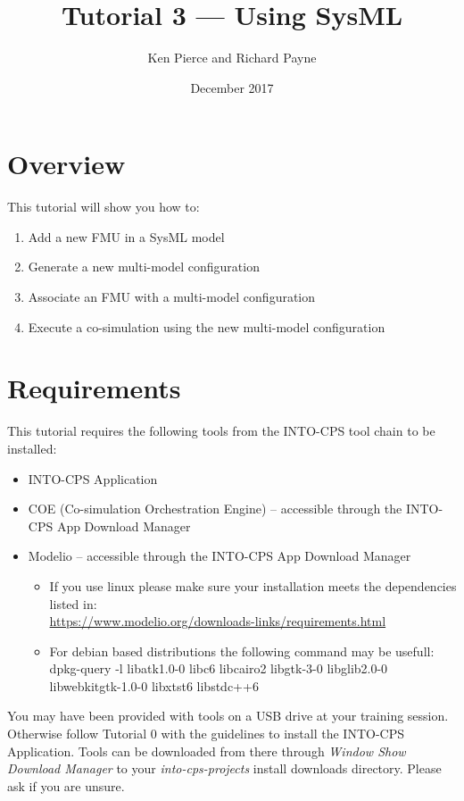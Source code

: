 \documentclass[11pt,a4paper]{../tutorial}
\title{Tutorial 3 --- Using SysML}
\date{December 2017}
\author{Ken Pierce and Richard Payne}
\begin{document}
\section*{Overview}

This tutorial will show you how to:

\begin{enumerate}[noitemsep]
\item Add a new FMU in a SysML model
\item Generate a new multi-model configuration
\item Associate an FMU with a multi-model configuration
\item Execute a co-simulation using the new multi-model configuration
\end{enumerate}

\section*{Requirements}

This tutorial requires the following tools from the INTO-CPS tool chain to be installed:

\begin{itemize}[noitemsep]
\item INTO-CPS Application
\item COE (Co-simulation Orchestration Engine) -- accessible through the INTO-CPS App Download Manager
\item Modelio -- accessible through the INTO-CPS App Download Manager
	\begin{small}
	\begin{itemize}
		\item If you use linux please make sure your installation meets the dependencies listed in:\\ \url{https://www.modelio.org/downloads-links/requirements.html}
		\item For debian based distributions the following command may be usefull:\\
		dpkg-query -l  libatk1.0-0 libc6 libcairo2 libgtk-3-0 libglib2.0-0 libwebkitgtk-1.0-0 libxtst6 libstdc++6
	\end{itemize}
	\end{small}
\end{itemize}

You may have been provided with tools on a USB drive at your training session. Otherwise follow Tutorial 0 with the guidelines to install the INTO-CPS Application. Tools can be downloaded from there through \emph{Window \menusep Show Download Manager} to your \emph{into-cps-projects} install downloads directory. Please ask if you are unsure.
\end{document}
